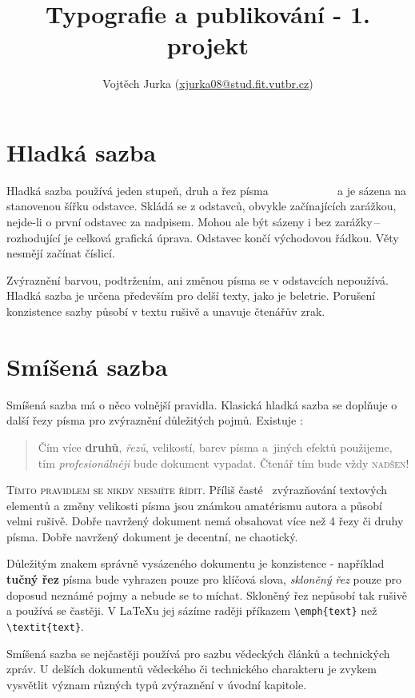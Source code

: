 \documentclass[10pt, twocolumn]{article}
\title{Typografie a publikování - 1. projekt}
\author{Vojtěch Jurka ({\fontfamily{cmtt}\selectfont\href{mailto:xjurka08@stud.fit.vutbr.cz}{xjurka08@stud.fit.vutbr.cz}})}
\date{}
\begin{document}
\maketitle

\section{Hladká sazba}
Hladká sazba používá jeden stupeň, druh a řez písma ~~~~~~~~~~~ a je sázena na stanovenou šířku odstavce. Skládá se z odstavců, obvykle začínajících zarážkou, nejde-li o první odstavec za nadpisem. Mohou ale být sázeny i bez zarážky\,-- rozhodující je celková grafická úprava. Odstavec končí východovou řádkou. Věty nesmějí začínat číslicí.

Zvýraznění barvou, podtržením, ani změnou písma se v odstavcích nepoužívá. Hladká sazba je určena především pro delší texty, jako je beletrie. Porušení konzistence sazby působí v textu rušivě a unavuje čtenářův zrak.

\section{Smíšená sazba} \label{section2}
Smíšená sazba má o něco volnější pravidla. Klasická hladká sazba se doplňuje o další řezy písma pro zvýraznění důležitých pojmů. Existuje :

\begin{quote}
    Čím více \textbf {druhů}, \textit {řezů}, {\footnotesize velikostí}, barev písma \textsf{a~jiných {\tiny efektů}} použijeme, tím \emph{profesionálněji} bude  dokument vypadat. Čtenář tím {\large bude} {\LARGE vždy} {\Huge \textsc{nadšen!}}
\end{quote}

\textsc{Tímto pravidlem se nikdy nesmíte řídit.} Příliš časté~ zvýrazňování textových elementů a změny velikosti písma jsou známkou amatérismu autora a působí velmi rušivě. Dobře navržený dokument nemá obsahovat více než
4 řezy či druhy písma. Dobře navržený dokument je decentní, ne chaotický.

Důležitým znakem správně vysázeného dokumentu je konzistence - například \textbf{tučný řez} písma bude vyhrazen pouze pro klíčová slova, \textit{skloněný řez} pouze pro doposud neznámé pojmy a nebude se to míchat. Skloněný řez ne\-působí tak rušivě a používá se častěji. V \LaTeX u jej sázíme raději příkazem \verb|\emph{text}| než \verb|\textit{text}|.

Smíšená sazba se nejčastěji používá pro sazbu vědeckých článků a technických zpráv. U delších dokumentů vědeckého či technického charakteru je zvykem vysvětlit význam různých typů zvýraznění v úvodní kapitole.
\end{document}
